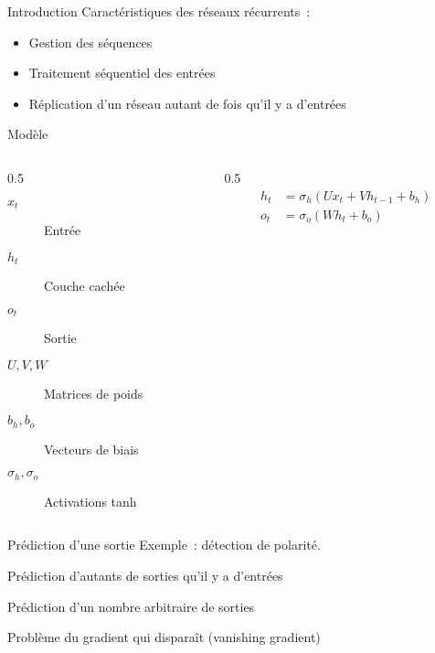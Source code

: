 \begin{frame}{Introduction}
  Caractéristiques des réseaux récurrents~:

  \begin{itemize}[<+->]
    \item Gestion des séquences
    \item Traitement séquentiel des entrées
    \item Réplication d'un réseau autant de fois qu'il y a d'entrées
  \end{itemize}
\end{frame}

\begin{frame}{Modèle}

  \begin{columns}
    \begin{column}{0.5\tw}
      \begin{description}
        \item[$x_t$] Entrée
        \item[$h_t$] Couche cachée
        \item[$o_t$] Sortie
        \item[$U, V, W$] Matrices de poids
        \item[$b_h, b_o$] Vecteurs de biais
        \item[$\sigma_h, \sigma_o$] Activations tanh
      \end{description}
    \end{column}
    \begin{column}{0.5\tw}
      \begin{align*}
      h_t & = \sigma_h(U x_t + V h_{t - 1} + b_h) \\
      o_t & = \sigma_o(W h_t + b_o) \\
      \end{align*}
    \end{column}
  \end{columns}
\end{frame}

\begin{frame}{Prédiction d'une sortie}
  Exemple~: détection de polarité.

  \begin{figure}
    \centering
  \end{figure}
\end{frame}

\begin{frame}{Prédiction d'autants de sorties qu'il y a d'entrées}
\end{frame}

\begin{frame}{Prédiction d'un nombre arbitraire de sorties}
\end{frame}

\begin{frame}{Problème du gradient qui disparaît (vanishing gradient)}
\end{frame}
